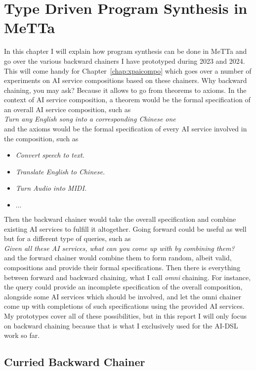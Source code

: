 \documentclass[]{report}
\begin{document}
\chapter{Type Driven Program Synthesis in MeTTa}

In this chapter I will explain how program synthesis can be done in
MeTTa and go over the various backward chainers I have prototyped
during 2023 and 2024.  This will come handy for
Chapter~\ref{chap:xpaicompo} which goes over a number of experiments
on AI service compositions based on these chainers.  Why backward
chaining, you may ask?  Because it allows to go from theorems to
axioms.  In the context of AI service composition, a theorem would be
the formal specification of an overall AI service composition, such
as\\

\emph{Turn any English song into a corresponding Chinese one}\\[0.4cm]
and the axioms would be the formal specification of every AI service
involved in the composition, such as
\begin{itemize}
\item \emph{Convert speech to text.}
\item \emph{Translate English to Chinese.}
\item \emph{Turn Audio into MIDI.}
\item $\dots$
\end{itemize}
Then the backward chainer would take the overall specification and
combine existing AI services to fulfill it altogether.  Going forward
could be useful as well but for a different type of queries, such as\\

\emph{Given all these AI services, what can you come up with by
combining them?}\\[0.4cm] and the forward chainer would combine them
to form random, albeit valid, compositions and provide their formal
specifications.  Then there is everything between forward and backward
chaining, what I call \emph{omni} chaining.  For instance, the query
could provide an incomplete specification of the overall composition,
alongside some AI services which should be involved, and let the omni
chainer come up with completions of such specifications using the
provided AI services.  My prototypes cover all of these possibilities,
but in this report I will only focus on backward chaining because that
is what I exclusively used for the AI-DSL work so far.
\section{Curried Backward Chainer}
\label{sec:curriedbc}
\end{document}
